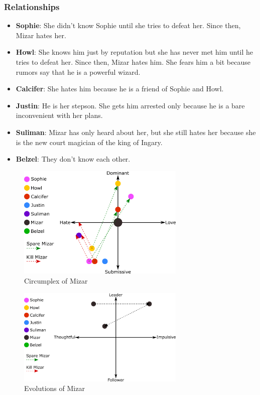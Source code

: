 \subsubsection*{Relationships}
\begin{itemize}
\item \textbf{Sophie}: She didn’t know Sophie until she tries to defeat her. Since then, Mizar hates her.
\item \textbf{Howl}: She knows him just by reputation but she has never met him until he tries to defeat her. Since then, Mizar hates him. She fears him a bit because rumors say that he is a powerful wizard.
\item \textbf{Calcifer}: She hates him because he is a friend of Sophie and Howl.
\item \textbf{Justin}: He is her stepson. She gets him arrested only because he is a bare  inconvenient with her plans. 
\item \textbf{Suliman}: Mizar has only heard about her, but she still hates her because she is the new court magician of the king of Ingary.
\item \textbf{Belzel}: They don't know each other.
\end{itemize}

\begin{figure}[H]
  \centering
  \includegraphics[width=8cm]{Images/SVG/Exported/Circumplexes/mizarCircumplex}
  \caption{Circumplex of Mizar}
\end{figure}

\begin{figure}[H]
  \centering
  \includegraphics[width=8cm]{Images/SVG/Exported/Evolutions/mizarEvolution}
  \caption{Evolutions of Mizar}
\end{figure}

